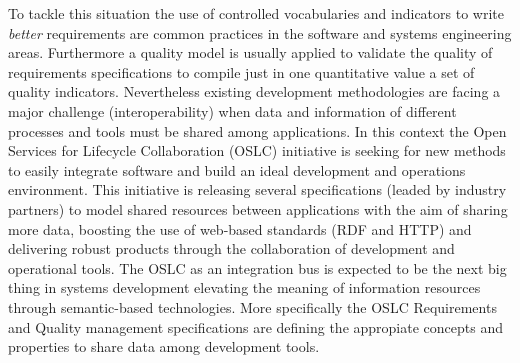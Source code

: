 To tackle this situation the use of controlled vocabularies and indicators to write \textit{better} requirements are 
common practices in the software and systems engineering areas. Furthermore a quality model is usually applied to validate the quality 
of requirements specifications to compile just in one quantitative value a set of quality indicators. Nevertheless 
existing development methodologies are facing a major challenge (interoperability) when data and information of different processes 
and tools must be shared among applications. In this context the Open Services for Lifecycle Collaboration (OSLC) 
initiative is seeking for new methods to easily integrate software and build an ideal development and operations environment.  
This initiative is releasing several specifications (leaded by industry partners) to model shared resources 
between applications with the aim of sharing more data, boosting the use of web-based standards (RDF and HTTP) 
and delivering robust products through the collaboration of development and operational tools. The OSLC as an integration 
bus is expected to be the next big thing in systems development elevating the meaning of information resources through 
semantic-based technologies. More specifically the OSLC Requirements and Quality management specifications are defining 
the appropiate concepts and properties to share data among development tools. 

